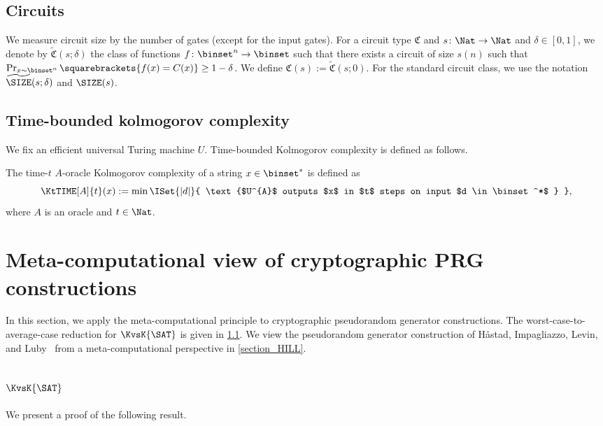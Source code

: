 \documentclass{toc}
\begin{document}
\subsection{Circuits}
We measure circuit size by the number of gates (except for the input gates).
For a circuit type $\mathfrak{C}$ and $s \colon \Nat \to \Nat$ and $\delta \in [0, 1]$,
we denote by $\widetilde{\mathfrak{C}}(s; \delta)$
the class of functions $f \colon \binset^n \to \binset$
such that
there exists a circuit of size $s(n)$
such that
$\Pr_{x \sim \binset^n} \squarebrackets{ f(x) = C(x) } \ge 1 - \delta$.
We define $\mathfrak{C}(s) := \widetilde{\mathfrak{C}}(s; 0)$.
For the standard circuit class,
we use the notation $\widetilde{\SIZE}(s; \delta)$ and $\SIZE(s)$.


\subsection{Time-bounded kolmogorov complexity}
We fix an efficient universal Turing machine $U$.
Time-bounded Kolmogorov complexity is defined as follows.
\begin{definition}
  The time-$t$ $A$-oracle Kolmogorov complexity of a string $x \in \binset^*$
  is defined as
  $$
    \KtTIME[A]{t}(x) := \min \ISet{ |d| } { \text{$U^{A}$ outputs $x$ in $t$ steps on input $d \in \binset^*$ } },
  $$
  where $A$ is an oracle and $t \in \Nat$.
\end{definition}


\section{Meta-computational view of cryptographic PRG constructions}

In this section,
we apply the meta-computational principle to cryptographic pseudorandom generator constructions.
The worst-case-to-average-case reduction for $\KvsK{\SAT}$
is given in \cref{section_Heuristica}.
We view the pseudorandom generator construction of
H{\aa}stad, Impagliazzo, Levin, and Luby~\cite{HastadILL99_siamcomp_journals}
from a meta-computational perspective
in \cref{section_HILL}.

\subsection{\texorpdfstring{$\KvsK{\SAT}$}{Gap(K(SAT) vs K)}}
\label{section_Heuristica}

We present a proof of the following result.
\end{document}
